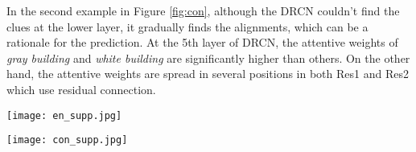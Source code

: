 \documentclass[letterpaper]{article} \usepackage{aaai19}  \usepackage{times}  \usepackage{helvet}  \usepackage{courier}  \usepackage{url}  \usepackage{graphicx}  \frenchspacing  \setlength{\pdfpagewidth}{8.5in}  \setlength{\pdfpageheight}{11in}
\begin{document}
In the second example in Figure \ref{fig:con}, although the DRCN couldn't find the clues at the lower layer, it gradually finds the alignments, which can be a rationale for the prediction. At the 5th layer of DRCN, the attentive weights of \textit{gray building} and \textit{white building} are significantly higher than others. On the other hand, the attentive weights are spread in several positions in both Res1 and Res2 which use residual connection.



\begin{figure*}[t]
  \centering
  \texttt{[image: en\_supp.jpg]}
  \caption{Visualization of attentive weights on the \textit{entailment} example. The premise is ``\textit{two bicyclists in spandex and helmets in a race pedaling uphill.}" and the hypothesis is ``\textit{A pair of humans are riding their
    bicycle with tight clothing, competing with each other.}". The attentive weights of DRCN, Res1, and Res2 are presented from left to right.}
  \label{fig:en}
\end{figure*}


\begin{figure*}[t]
  \centering
  \texttt{[image: con\_supp.jpg]}
  \caption{Visualization of attentive weights on the \textit{contradiction} example. The premise is ``\textit{Several men in front of a white building.}"  and the hypothesis is ``\textit{Several people in front of a gray building.}". The attentive weights of DRCN, Res1, and Res2 are presented from left to right.}
  \label{fig:con}
\end{figure*}
\end{document}
